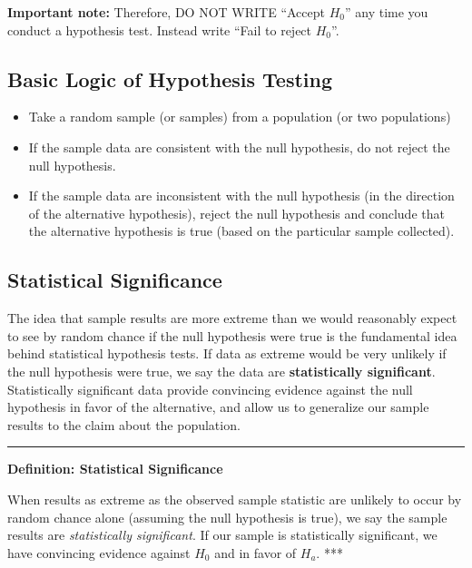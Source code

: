 \documentclass[]{tufte-book}
\let\oldrule=\rule
\renewcommand{\rule}[1]{\oldrule{\linewidth}}
\providecommand{\tightlist}{%
  \setlength{\itemsep}{0pt}\setlength{\parskip}{0pt}}
\begin{document}
\textbf{Important note:} Therefore, DO NOT WRITE ``Accept \(H_0\)'' any
time you conduct a hypothesis test. Instead write ``Fail to reject
\(H_0\)''.

\subsection{Basic Logic of Hypothesis
Testing}\label{basic-logic-of-hypothesis-testing}

\begin{itemize}
\tightlist
\item
  Take a random sample (or samples) from a population (or two
  populations)
\item
  If the sample data are consistent with the null hypothesis, do not
  reject the null hypothesis.
\item
  If the sample data are inconsistent with the null hypothesis (in the
  direction of the alternative hypothesis), reject the null hypothesis
  and conclude that the alternative hypothesis is true (based on the
  particular sample collected).
\end{itemize}

\subsection{Statistical Significance}\label{statistical-significance}

The idea that sample results are more extreme than we would reasonably
expect to see by random chance if the null hypothesis were true is the
fundamental idea behind statistical hypothesis tests. If data as extreme
would be very unlikely if the null hypothesis were true, we say the data
are \textbf{statistically significant}. Statistically significant data
provide convincing evidence against the null hypothesis in favor of the
alternative, and allow us to generalize our sample results to the claim
about the population.

\begin{center}\rule{0.5\linewidth}{\linethickness}\end{center}

\textbf{Definition: Statistical Significance}

When results as extreme as the observed sample statistic are unlikely to
occur by random chance alone (assuming the null hypothesis is true), we
say the sample results are \emph{statistically significant}. If our
sample is statistically significant, we have convincing evidence against
\(H_0\) and in favor of \(H_a\). ***
\end{document}
